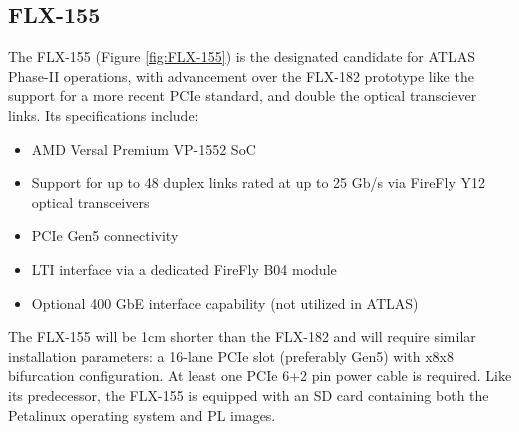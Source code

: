\subsection{FLX-155}

The FLX-155 (Figure \ref{fig:FLX-155}) is the designated candidate for \acs{ATLAS} Phase-II operations, with advancement over the FLX-182 prototype like the support for a more recent \acs{PCIe} standard, and double the optical transciever links. Its specifications include:

\begin{itemize}
    \item AMD Versal Premium VP-1552 SoC
    \item Support for up to 48 duplex links rated at up  to 25 Gb/s via FireFly Y12 optical transceivers
    \item \acs{PCIe} Gen5 connectivity
    \item \acs{LTI} interface via a dedicated FireFly B04 module
    \item Optional 400 GbE interface capability (not utilized in ATLAS)
\end{itemize}

The FLX-155 will be 1cm shorter than the FLX-182 and will require similar installation parameters: a 16-lane \acs{PCIe} slot (preferably Gen5) with x8x8 bifurcation configuration. At least one \acs{PCIe} 6+2 pin power cable is required. Like its predecessor, the FLX-155 is equipped with an SD card containing both the Petalinux operating system and \acl{PL} images.

